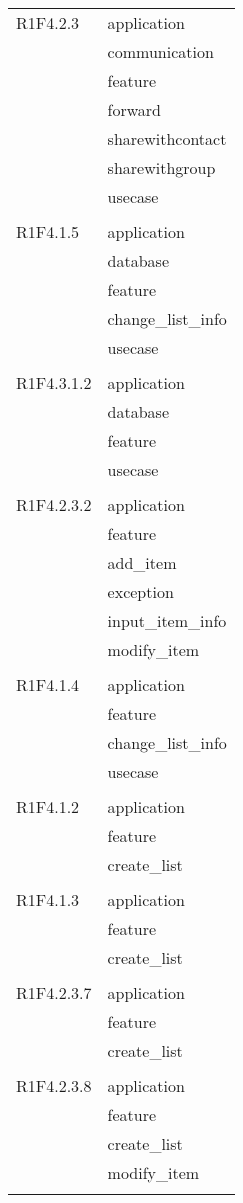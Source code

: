 \begin{center}
\begin{longtable}{|p{7cm}|p{5cm}|}
		R1F4.2.3 & application \\ & communication \\ & feature \\ & forward \\ & sharewithcontact \\ & sharewithgroup \\ & usecase \\ & \\ \hline
		R1F4.1.5 & application \\ & database \\ & feature \\ & change\_list\_info \\ & usecase \\ & \\ \hline
		R1F4.3.1.2 & application \\ & database \\ & feature \\ & usecase \\ & \\ \hline
		R1F4.2.3.2 & application \\ & feature \\ & add\_item \\ & exception \\ & input\_item\_info \\ & modify\_item \\ & \\ \hline
		R1F4.1.4 & application \\ & feature \\ & change\_list\_info \\ & usecase \\ & \\ \hline
		R1F4.1.2 & application \\ & feature \\ & create\_list \\ & \\ \hline
		R1F4.1.3 & application \\ & feature \\ & create\_list \\ & \\ \hline
		R1F4.2.3.7 & application \\ & feature \\ & create\_list \\ & \\ \hline
		R1F4.2.3.8 & application \\ & feature \\ & create\_list \\ & modify\_item \\ & \\ \hline

\end{longtable}
\end{center}
